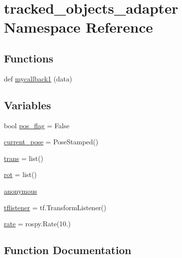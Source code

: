 \hypertarget{namespacetracked__objects__adapter}{}\section{tracked\+\_\+objects\+\_\+adapter Namespace Reference}
\label{namespacetracked__objects__adapter}
\subsection*{Functions}
\begin{DoxyCompactItemize}
\item 
def \hyperlink{namespacetracked__objects__adapter_aa9159f931fa00e5ccaf2ea118d9fab3d}{mycallback1} (data)
\end{DoxyCompactItemize}
\subsection*{Variables}
\begin{DoxyCompactItemize}
\item 
bool \hyperlink{namespacetracked__objects__adapter_a174da94c280faf7a1cf732be6855739f}{pos\+\_\+flag} = False
\item 
\hyperlink{namespacetracked__objects__adapter_acd6da79b4ebbc7777f1861371ef6bd2a}{current\+\_\+pose} = Pose\+Stamped()
\item 
\hyperlink{namespacetracked__objects__adapter_a567640623bec81f5470b8ccabda3567a}{trans} = list()
\item 
\hyperlink{namespacetracked__objects__adapter_a5cb9b213a87ca24a97729b3fba9a7733}{rot} = list()
\item 
\hyperlink{namespacetracked__objects__adapter_af4a427c4003ca85ae020af7899fe1c20}{anonymous}
\item 
\hyperlink{namespacetracked__objects__adapter_a11650b5ea8079756ceee7312396621b2}{tflistener} = tf.\+Transform\+Listener()
\item 
\hyperlink{namespacetracked__objects__adapter_abd2ffc41d426e7fb5529885d7bafa9b5}{rate} = rospy.\+Rate(10.)
\end{DoxyCompactItemize}


\subsection{Function Documentation}
\mbox{\label{namespacetracked__objects__adapter_aa9159f931fa00e5ccaf2ea118d9fab3d}} 
